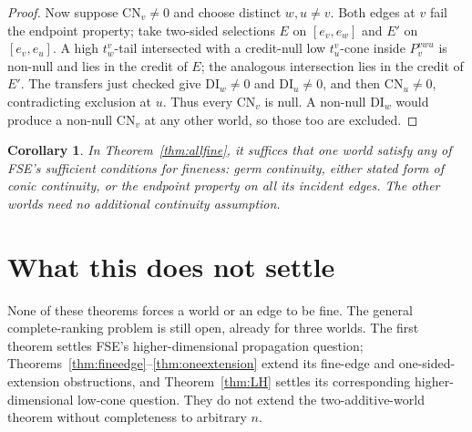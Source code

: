 \documentclass[11pt]{article}
\newtheorem{corollary}[theorem]{Corollary}
\theoremstyle{remark}\newtheorem{remark}[theorem]{Remark}
\begin{document}
\begin{proof}
Now suppose $\mathrm{CN}_v\ne0$ and choose distinct $w,u\ne v$.
Both edges at $v$ fail the endpoint property; take two-sided selections
$E$ on $[e_v,e_w]$ and $E'$ on $[e_v,e_u]$. A high $t^v_w$-tail
intersected with a credit-null low $t^v_u$-cone inside $P_v^{vwu}$
is non-null and lies in the credit of $E$; the analogous intersection
lies in the credit of $E'$. The transfers just checked give
$\mathrm{DI}_w\ne0$ and $\mathrm{DI}_u\ne0$, and then
$\mathrm{CN}_u\ne0$, contradicting exclusion at $u$.
Thus every $\mathrm{CN}_v$ is null. A non-null $\mathrm{DI}_w$ would
produce a non-null $\mathrm{CN}_v$ at any other world, so those too
are excluded.
\end{proof}

\begin{corollary}
In Theorem~\ref{thm:allfine}, it suffices that one world satisfy any of
FSE's sufficient conditions for fineness: germ continuity, either stated
form of conic continuity, or the endpoint property on all its incident
edges. The other worlds need no additional continuity assumption.
\end{corollary}

\section{What this does not settle}

None of these theorems forces a world or an edge to be fine. The general complete-ranking
problem is still open, already for three worlds. The first theorem
settles FSE's higher-dimensional propagation question;
Theorems~\ref{thm:fineedge}--\ref{thm:oneextension} extend its fine-edge
and one-sided-extension obstructions, and Theorem~\ref{thm:LH}
settles its corresponding higher-dimensional low-cone question.
They do not extend the two-additive-world theorem without completeness
to arbitrary $n$.
\end{document}
